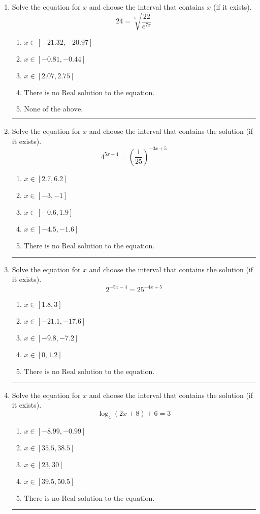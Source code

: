 \documentclass[14pt]{extbook}
\newcommand{\litem}[1]{\item#1\hspace*{-1cm}\rule{\textwidth}{0.4pt}}
\begin{document}
\begin{enumerate}
\litem{
 Solve the equation for $x$ and choose the interval that contains $x$ (if it exists).\[  24 = \sqrt[6]{\frac{22}{e^{7x}}} \]\begin{enumerate}[label=\Alph*.]
\item \( x \in [-21.32, -20.97] \)
\item \( x \in [-0.81, -0.44] \)
\item \( x \in [2.07, 2.75] \)
\item \( \text{There is no Real solution to the equation.} \)
\item \( \text{None of the above.} \)

\end{enumerate} }
\litem{
Solve the equation for $x$ and choose the interval that contains the solution (if it exists).\[ 4^{5x-4} = \left(\frac{1}{25}\right)^{-3x+5} \]\begin{enumerate}[label=\Alph*.]
\item \( x \in [2.7, 6.2] \)
\item \( x \in [-3, -1] \)
\item \( x \in [-0.6, 1.9] \)
\item \( x \in [-4.5, -1.6] \)
\item \( \text{There is no Real solution to the equation.} \)

\end{enumerate} }
\litem{
Solve the equation for $x$ and choose the interval that contains the solution (if it exists).\[ 2^{-5x-4} = 25^{-4x+5} \]\begin{enumerate}[label=\Alph*.]
\item \( x \in [1.8, 3] \)
\item \( x \in [-21.1, -17.6] \)
\item \( x \in [-9.8, -7.2] \)
\item \( x \in [0, 1.2] \)
\item \( \text{There is no Real solution to the equation.} \)

\end{enumerate} }
\litem{
Solve the equation for $x$ and choose the interval that contains the solution (if it exists).\[ \log_{4}{(2x+8)}+6 = 3 \]\begin{enumerate}[label=\Alph*.]
\item \( x \in [-8.99, -0.99] \)
\item \( x \in [35.5, 38.5] \)
\item \( x \in [23, 30] \)
\item \( x \in [39.5, 50.5] \)
\item \( \text{There is no Real solution to the equation.} \)


\end{enumerate}}
\end{enumerate}
\end{document}
